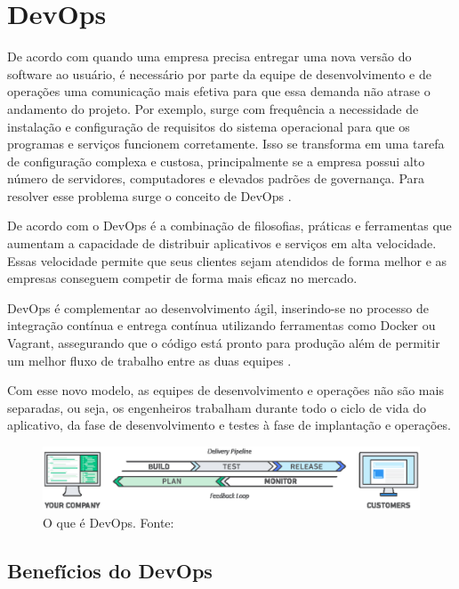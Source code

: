 \section{DevOps}

De acordo com \cite{zalla} quando uma empresa precisa entregar uma nova versão do software ao usuário, é necessário por parte da equipe de desenvolvimento e de operações uma comunicação mais efetiva para que essa demanda não atrase o andamento do projeto. Por exemplo, surge com frequência a necessidade de instalação e configuração de requisitos do sistema operacional para que os programas e serviços funcionem corretamente. Isso se transforma em uma tarefa de configuração complexa e custosa, principalmente se a empresa possui alto número de servidores, computadores e elevados padrões de governança. Para resolver esse problema surge o conceito de DevOps \cite{zalla}.

De acordo com \cite{amazon} o DevOps é a combinação de filosofias, práticas e ferramentas que aumentam a capacidade de distribuir aplicativos e serviços em alta velocidade. Essas velocidade permite que seus clientes sejam atendidos de forma melhor e as empresas conseguem competir de forma mais eficaz no mercado.

DevOps é complementar ao desenvolvimento ágil, inserindo-se no processo de integração contínua e entrega contínua utilizando ferramentas como Docker ou Vagrant, assegurando que o código está pronto para produção além de permitir um melhor fluxo de trabalho entre as duas equipes \cite{medrado}.

Com esse novo modelo, as equipes de desenvolvimento e operações não são mais separadas, ou seja, os engenheiros trabalham durante todo o ciclo de vida do aplicativo, da fase de desenvolvimento e testes à fase de implantação e operações.

\begin{figure}[H]
	\centering
  \includegraphics[keepaspectratio=true,scale=0.4]{figuras/devops_pipe.eps}
  \caption[O que é DevOps.]{O que é DevOps. Fonte: \cite{amazon}}
	\label{fig:devops2}
\end{figure}

\subsection{Benefícios do DevOps}

